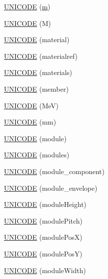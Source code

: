 \begin{DoxyCompactItemize}
\item 
\hyperlink{namespace_d_d4hep_1_1_x_m_l_adb83c4522f0c4de8816c6d306a4caf2e}{U\+N\+I\+C\+O\+DE} (\hyperlink{_volumes_8cpp_a6fc379aaec47ce424b00d8ffda2a6c59}{m})
\item 
\hyperlink{namespace_d_d4hep_1_1_x_m_l_a464cfc2460dcdcc1f7c2d5c1ee80775d}{U\+N\+I\+C\+O\+DE} (M)
\item 
\hyperlink{namespace_d_d4hep_1_1_x_m_l_a5357e2344aa4974c1ace5a41c7085393}{U\+N\+I\+C\+O\+DE} (material)
\item 
\hyperlink{namespace_d_d4hep_1_1_x_m_l_a7a9b31a06ebd35e5b180e0504a5e6730}{U\+N\+I\+C\+O\+DE} (materialref)
\item 
\hyperlink{namespace_d_d4hep_1_1_x_m_l_aeb8d384f5d46849af621f4928882a8d8}{U\+N\+I\+C\+O\+DE} (materials)
\item 
\hyperlink{namespace_d_d4hep_1_1_x_m_l_aa1b4759313fd98a9733d5f5b9b197f65}{U\+N\+I\+C\+O\+DE} (member)
\item 
\hyperlink{namespace_d_d4hep_1_1_x_m_l_a33af19b502f0cb2fc0edc3aff0058c5a}{U\+N\+I\+C\+O\+DE} (MeV)
\item 
\hyperlink{namespace_d_d4hep_1_1_x_m_l_a0ebbfa81b0637122ebe8a95c75ad8dca}{U\+N\+I\+C\+O\+DE} (mm)
\item 
\hyperlink{namespace_d_d4hep_1_1_x_m_l_a93c8cbfeffaed013e345e6fe45106a7c}{U\+N\+I\+C\+O\+DE} (module)
\item 
\hyperlink{namespace_d_d4hep_1_1_x_m_l_aa8467fc611f341ca8e61ad197414c986}{U\+N\+I\+C\+O\+DE} (modules)
\item 
\hyperlink{namespace_d_d4hep_1_1_x_m_l_a369200919680954eee237afd8c25556e}{U\+N\+I\+C\+O\+DE} (module\+\_\+component)
\item 
\hyperlink{namespace_d_d4hep_1_1_x_m_l_aa50cd77c10950a1ec1948ece8a837fa7}{U\+N\+I\+C\+O\+DE} (module\+\_\+envelope)
\item 
\hyperlink{namespace_d_d4hep_1_1_x_m_l_a60cd41b01ef952ecf409bd435f9d73fc}{U\+N\+I\+C\+O\+DE} (module\+Height)
\item 
\hyperlink{namespace_d_d4hep_1_1_x_m_l_ada6a75e6c0c54ecd53340fa1ddd1a32f}{U\+N\+I\+C\+O\+DE} (module\+Pitch)
\item 
\hyperlink{namespace_d_d4hep_1_1_x_m_l_a30c3d2ead1a959de5e1e655caf18dd5b}{U\+N\+I\+C\+O\+DE} (module\+PosX)
\item 
\hyperlink{namespace_d_d4hep_1_1_x_m_l_a26ea3c02013856eaad65b0411cea2786}{U\+N\+I\+C\+O\+DE} (module\+PosY)
\item 
\hyperlink{namespace_d_d4hep_1_1_x_m_l_a9afd0c09663cbee7f1e3b11a402453f6}{U\+N\+I\+C\+O\+DE} (module\+Width)

\end{DoxyCompactItemize}
